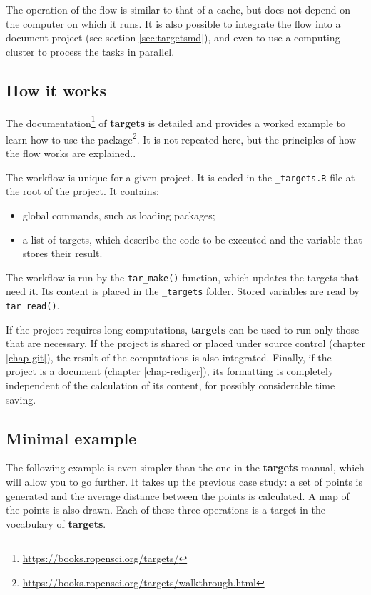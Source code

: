 \documentclass[
  12pt,
  american,
  a4paper,
  extrafontsizes,onecolumn,openright
  ]{memoir}
\providecommand{\tightlist}{%
  \setlength{\itemsep}{0pt}\setlength{\parskip}{0pt}}
\begin{document}
The operation of the flow is similar to that of a cache, but does not depend on the computer on which it runs.
It is also possible to integrate the flow into a document project (see section \ref{sec:targetsmd}), and even to use a computing cluster to process the tasks in parallel.

\hypertarget{how-it-works-1}{%
\subsection{How it works}\label{how-it-works-1}}

The documentation\footnote{\url{https://books.ropensci.org/targets/}} of \textbf{targets} is detailed and provides a worked example to learn how to use the package\footnote{\url{https://books.ropensci.org/targets/walkthrough.html}}.
It is not repeated here, but the principles of how the flow works are explained..

The workflow is unique for a given project.
It is coded in the \texttt{\_targets.R} file at the root of the project.
It contains:

\begin{itemize}
\tightlist
\item
  global commands, such as loading packages;
\item
  a list of targets, which describe the code to be executed and the variable that stores their result.
\end{itemize}

The workflow is run by the \texttt{tar\_make()} function, which updates the targets that need it.
Its content is placed in the \texttt{\_targets} folder.
Stored variables are read by \texttt{tar\_read()}.

If the project requires long computations, \textbf{targets} can be used to run only those that are necessary.
If the project is shared or placed under source control (chapter \ref{chap-git}), the result of the computations is also integrated.
Finally, if the project is a document (chapter \ref{chap-rediger}), its formatting is completely independent of the calculation of its content, for possibly considerable time saving.

\hypertarget{minimal-example}{%
\subsection{Minimal example}\label{minimal-example}}

The following example is even simpler than the one in the \textbf{targets} manual, which will allow you to go further.
It takes up the previous case study: a set of points is generated and the average distance between the points is calculated.
A map of the points is also drawn.
Each of these three operations is a target in the vocabulary of \textbf{targets}.
\end{document}
